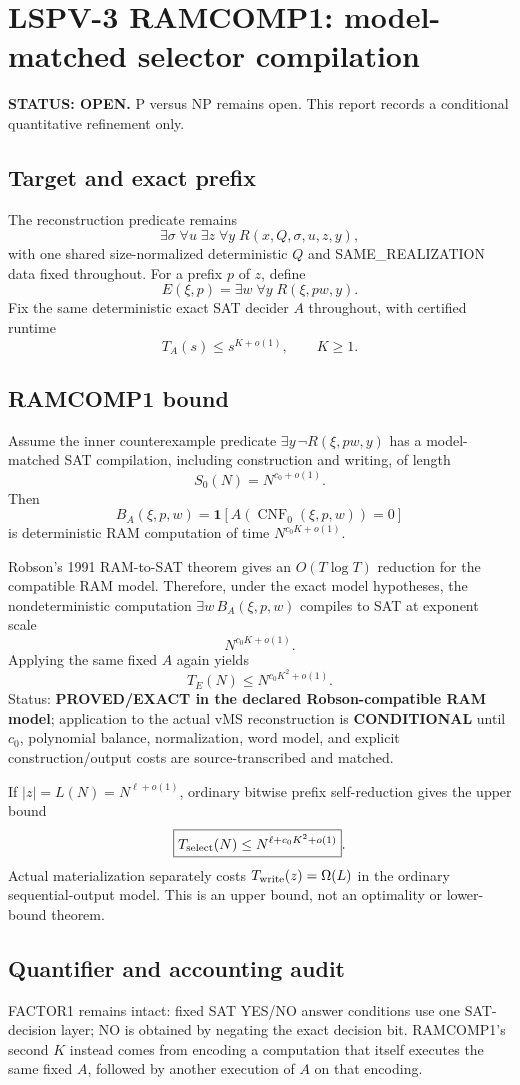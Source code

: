\documentclass[11pt]{article}
\begin{document}
\section*{LSPV-3 RAMCOMP1: model-matched selector compilation}
\textbf{STATUS: OPEN.} P versus NP remains open. This report records a conditional quantitative refinement only.

\subsection*{Target and exact prefix}
The reconstruction predicate remains
\[
\exists\sigma\;\forall u\;\exists z\;\forall y\;R(x,Q,\sigma,u,z,y),
\]
with one shared size-normalized deterministic $Q$ and SAME\_REALIZATION data fixed throughout. For a prefix $p$ of $z$, define
\[
E(\xi,p)=\exists w\;\forall y\;R(\xi,pw,y).
\]
Fix the same deterministic exact SAT decider $A$ throughout, with certified runtime
\[T_A(s)\le s^{K+o(1)},\qquad K\ge1.\]

\subsection*{RAMCOMP1 bound}
Assume the inner counterexample predicate $\exists y\,\neg R(\xi,pw,y)$ has a model-matched SAT compilation, including construction and writing, of length
\[S_0(N)=N^{c_0+o(1)}.\]
Then
\[
B_A(\xi,p,w)=\mathbf 1[A(\operatorname{CNF}_0(\xi,p,w))=0]
\]
is deterministic RAM computation of time $N^{c_0K+o(1)}$.

Robson's 1991 RAM-to-SAT theorem gives an $O(T\log T)$ reduction for the compatible RAM model. Therefore, under the exact model hypotheses, the nondeterministic computation $\exists w\,B_A(\xi,p,w)$ compiles to SAT at exponent scale
\[N^{c_0K+o(1)}.\]
Applying the same fixed $A$ again yields
\[
\boxed{T_E(N)\le N^{c_0K^2+o(1)}}.
\]
Status: \textbf{PROVED/EXACT in the declared Robson-compatible RAM model}; application to the actual vMS reconstruction is \textbf{CONDITIONAL} until $c_0$, polynomial balance, normalization, word model, and explicit construction/output costs are source-transcribed and matched.

If $|z|=L(N)=N^{\ell+o(1)}$, ordinary bitwise prefix self-reduction gives the upper bound
\[
\boxed{T_{\rm select}(N)\le N^{\ell+c_0K^2+o(1)}}.
\]
Actual materialization separately costs $T_{\rm write}(z)=\Omega(L)$ in the ordinary sequential-output model. This is an upper bound, not an optimality or lower-bound theorem.

\subsection*{Quantifier and accounting audit}
FACTOR1 remains intact: fixed SAT YES/NO answer conditions use one SAT-decision layer; NO is obtained by negating the exact decision bit. RAMCOMP1's second $K$ instead comes from encoding a computation that itself executes the same fixed $A$, followed by another execution of $A$ on that encoding.
\end{document}
